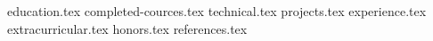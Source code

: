 \documentclass[11pt, letterpaper]{awesome-cv}
\makeatletter
\newcommand*{\sectiondir}{resume/}
\def@asdfasdf
\makeatother
\begin{document}
\makecvheader
\vspace{-4mm}
{education.tex}
{completed-cources.tex}
{technical.tex}
{projects.tex}
{experience.tex}
\pagebreak
{extracurricular.tex}
{honors.tex}
{references.tex}
\end{document}
